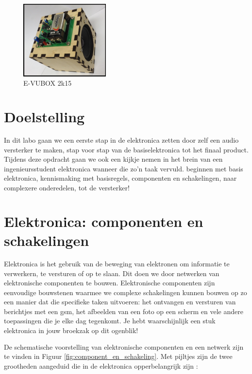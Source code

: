 \documentclass{article}
\begin{document}
\maketitle
\begin{figure}[htbp]
	\centering
	\includegraphics[width=0.4\textwidth]{foto}
	\caption{ E-VUBOX 2k15}
	\label{fig:foto}
\end{figure}
\tableofcontents
\section{Doelstelling}
In dit labo gaan we een eerste stap in de elektronica zetten door zelf een audio versterker te maken, stap voor stap van de basiselektronica tot het finaal product. Tijdens deze opdracht gaan we ook een kijkje nemen in het brein van een ingenieursstudent elektronica wanneer die zo'n taak vervuld. 
beginnen met basis elektronica, kennismaking met basisregels, componenten en schakelingen, naar complexere onderedelen, tot de versterker!

\section{Elektronica: componenten en schakelingen}
Elektronica is het gebruik van de beweging van elektronen om informatie te verwerkern, te versturen of op te slaan. Dit doen we door netwerken van elektronische componenten te bouwen. Elektronische componenten zijn eenvoudige bouwstenen waarmee we complexe schakelingen kunnen bouwen op zo een manier dat die specifieke taken uitvoeren: het ontvangen en versturen van berichtjes met een gsm, het afbeelden van een foto op een scherm en vele andere toepassingen die je elke dag tegenkomt. Je hebt waarschijnlijk een stuk elektronica in jouw broekzak op dit ogenblik!

De schematische voorstelling van elektronische componenten en een netwerk zijn te vinden in Figuur \ref{fig:component_en_schakeling}. Met pijltjes zijn de twee grootheden aangeduid die in de elektronica opperbelangrijk zijn :
\end{document}
